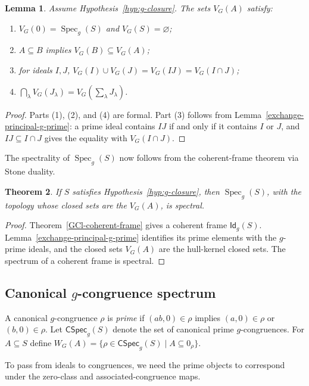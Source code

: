 \documentclass[11pt,leqno]{amsart}
\theoremstyle{plain}
\newtheorem{theorem}{Theorem}[section]
\newtheorem{lemma}[theorem]{Lemma}
\theoremstyle{definition}
\theoremstyle{remark}
\numberwithin{equation}{section}
\DeclareMathOperator{\Spec}{Spec}
\newcommand{\GCl}{\mathsf{Id}_{g}}
\newcommand{\GCSpec}{\mathsf{CSpec}_{g}}
\newcommand{\zero}[1]{0_{#1}}
\begin{document}
\begin{lemma}\label{loc31}
Assume Hypothesis~\ref{hyp:g-closure}.  The sets $V_G(A)$ satisfy:
\begin{enumerate}
\item $V_G(0)=\Spec_g(S)$ and $V_G(S)=\varnothing$;
\item $A\subseteq B$ implies $V_G(B)\subseteq V_G(A)$;
\item for ideals $I,J$,
  $V_G(I)\cup V_G(J)=V_G(IJ)=V_G(I\cap J)$;
\item $\bigcap_\lambda V_G(J_\lambda)=V_G(\sum_\lambda J_\lambda)$.
\end{enumerate}
\end{lemma}
\begin{proof}
Parts (1), (2), and (4) are formal.
Part (3) follows from Lemma~\ref{exchange-principal-g-prime}:
a prime ideal contains $IJ$ if and only if it contains $I$ or $J$,
and $IJ\subseteq I\cap J$ gives the equality with $V_G(I\cap J)$.
\end{proof}

The spectrality of $\Spec_g(S)$ now follows from the
coherent-frame theorem via Stone duality.

\begin{theorem}\label{Spec_g-is-spectral}
If $S$ satisfies Hypothesis~\ref{hyp:g-closure}, then $\Spec_g(S)$,
with the topology whose closed sets are the $V_G(A)$, is spectral.
\end{theorem}
\begin{proof}
Theorem~\ref{GCl-coherent-frame} gives a coherent frame $\GCl(S)$.
Lemma~\ref{exchange-principal-g-prime} identifies its prime elements
with the $g$-prime ideals, and the closed sets $V_G(A)$ are the
hull-kernel closed sets.
The spectrum of a coherent frame is spectral.
\end{proof}

\subsection{Canonical \texorpdfstring{$g$}{g}-congruence spectrum}

A canonical $g$-congruence $\rho$ is \emph{prime} if
$(ab,0)\in\rho$ implies $(a,0)\in\rho$ or $(b,0)\in\rho$.
Let $\GCSpec(S)$ denote the set of canonical prime $g$-congruences.
For $A\subseteq S$ define
$W_G(A)=\{\rho\in\GCSpec(S)\mid A\subseteq\zero\rho\}$.

To pass from ideals to congruences, we need the prime objects
to correspond under the zero-class and associated-congruence maps.
\end{document}
